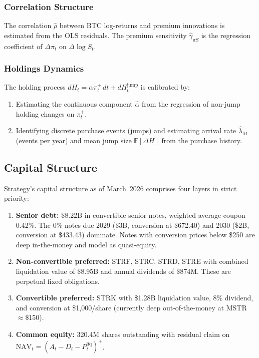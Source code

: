 \subsubsection{Correlation Structure}

The correlation $\hat\rho$ between BTC log-returns and premium innovations
is estimated from the OLS residuals.  The premium sensitivity
$\hat\gamma_{\pi S}$ is the regression coefficient of $\Delta\pi_t$ on
$\Delta\log S_t$.

\subsubsection{Holdings Dynamics}

The holding process $dH_t = \alpha\pi_t^+\,dt + dH_t^{\mathrm{jump}}$
is calibrated by:
\begin{enumerate}
  \item Estimating the continuous component $\hat\alpha$ from the regression
    of non-jump holding changes on $\pi_t^+$.
  \item Identifying discrete purchase events (jumps) and estimating
    arrival rate $\hat\lambda_M$ (events per year) and mean jump size
    $\mathbb{E}[\Delta H]$ from the purchase history.
\end{enumerate}

\subsection{Capital Structure}\label{sec:capstruct_empirical}

Strategy's capital structure as of March~2026 comprises four layers
in strict priority:

\begin{enumerate}
  \item \textbf{Senior debt:} \$8.22B in convertible senior notes,
    weighted average coupon 0.42\%.  The 0\% notes due 2029 (\$3B,
    conversion at \$672.40) and 2030 (\$2B, conversion at \$433.43)
    dominate.  Notes with conversion prices below \$250 are deep
    in-the-money and model as quasi-equity.
  \item \textbf{Non-convertible preferred:} STRF, STRC, STRD, STRE
    with combined liquidation value of \$8.95B and annual dividends
    of \$874M.  These are perpetual fixed obligations.
  \item \textbf{Convertible preferred:} STRK with \$1.28B liquidation
    value, 8\% dividend, and conversion at \$1,000/share (currently
    deep out-of-the-money at MSTR $\approx$\$150).
  \item \textbf{Common equity:} 320.4M shares outstanding with
    residual claim on $\mathrm{NAV}_t = (A_t - D_t - P_t^{\mathrm{liq}})^+$.
\end{enumerate}

